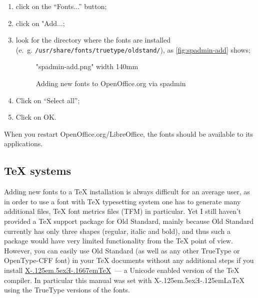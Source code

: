 \documentclass[12pt,a4paper,openany]{book}
\providecommand{\XeTeX}{X\kern-.125em\lower.5ex\hbox{Ǝ}\kern-.1667em\TeX}
\providecommand{\XeLaTeX}{X\kern-.125em\lower.5ex\hbox{Ǝ}\kern-.125em\LaTeX}
\begin{document}
\begin{enumerate}

\item click on the “Fonts...” button;

\item click on "Add...;

\item look for the directory where the fonts are installed\\ (e.~g.
\texttt{/usr/share/fonts/truetype/oldstand/}), as \autoref{fig:spadmin-add}
shows;

\begin{figure}[htb]

\centerline{\XeTeXpicfile "spadmin-add.png" width 140mm}

\caption{Adding new fonts to OpenOffice.org via spadmin}

\hypertarget{fig:spadmin-add}{}\label{fig:spadmin-add}

\end{figure}

\item Click on “Select all”;

\item Click on OK.

\end{enumerate}

When you restart OpenOffice.org/LibreOffice, the fonts should be available to its
applications.

\subsection{{\TeX} systems}

Adding new fonts to a \TeX{} installation is always difficult for an
average user, as in order to use a font with \TeX{} typesetting system one
has to generate many additional files, \TeX{} font metrics files (TFM) in
particular. Yet I still haven’t provided a \TeX{} support package for Old
Standard, mainly because Old Standard currently has only three shapes
(regular, italic and bold), and thus such a package would have very limited
functionality from the \TeX{} point of view. However, you can easily use
Old Standard (as well as any other TrueType or OpenType-CFF font) in your
\TeX{} documents without any additional steps if you install
\href{http://scripts.sil.org/xetex}{\XeTeX}~— a Unicode enabled version of
the \TeX{} compiler. In particular this manual was set with \XeLaTeX{}
using the TrueType versions of the fonts. 
\end{document}
